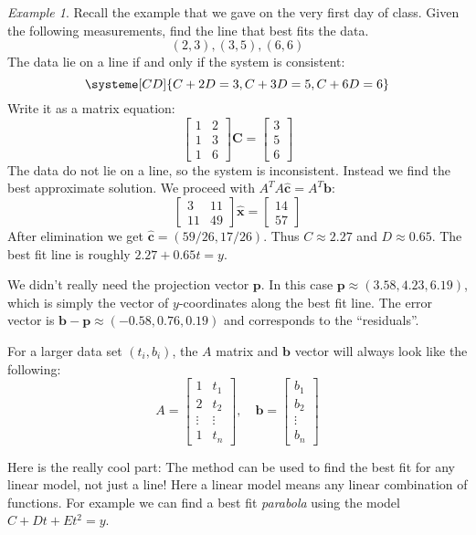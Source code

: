 \documentclass[11pt,oneside]{amsbook}
\theoremstyle{definition}
\theoremstyle{plain}
\theoremstyle{definition}
\theoremstyle{remark}
\newtheorem{example}[theorem]{Example}
\numberwithin{equation}{section}
\numberwithin{figure}{section}
\begin{document}
\begin{example}
  Recall the example that we gave on the very first day of class. Given the following measurements, find the line that best fits the data.
  \[(2,3),(3,5),(6,6)
  \]
  The data lie on a line if and only if the system is consistent:
  \[\systeme[CD]{C+2D=3,C+3D=5,C+6D=6}
  \]
  Write it as a matrix equation:
  \[\begin{bmatrix}1&2\\1&3\\1&6\end{bmatrix}
    \bm{C}=\begin{bmatrix}3\\5\\6\end{bmatrix}
  \]
  The data do not lie on a line, so the system is inconsistent. Instead we find the best approximate solution. We proceed with $A^TA\hat{\bm{c}}=A^T\bm{b}$:
  \[\begin{bmatrix}3&11\\11&49\end{bmatrix}\hat{\bm{x}}=\begin{bmatrix}14\\57\end{bmatrix}
  \]
  After elimination we get $\hat{\bm{c}}=(59/26,17/26)$. Thus $C\approx2.27$ and $D\approx0.65$. The best fit line is roughly $2.27+0.65t=y$.

  We didn't really need the projection vector $\bm{p}$. In this case $\bm{p}\approx(3.58,4.23,6.19)$, which is simply the vector of $y$-coordinates along the best fit line. The error vector is $\bm{b}-\bm{p}\approx(-0.58,0.76,0.19)$ and corresponds to the ``residuals''.
\end{example}

For a larger data set $(t_i,b_i)$, the $A$ matrix and $\bm{b}$ vector will always look like the following:
\[A=\begin{bmatrix}
    1&t_1\\
    2&t_2\\
    \vdots&\vdots\\
    1&t_n
  \end{bmatrix}
  ,\quad
  \bm{b}=\begin{bmatrix}b_1\\b_2\\\vdots\\b_n\end{bmatrix}
\]

Here is the really cool part: The method can be used to find the best fit for any linear model, not just a line! Here a linear model means any linear combination of functions. For example we can find a best fit \emph{parabola} using the model $C+Dt+Et^2=y$.
\end{document}
